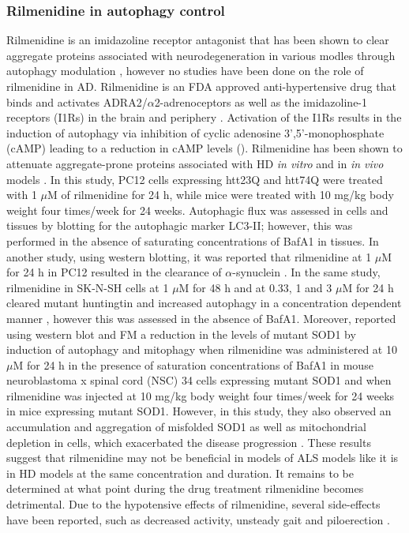 \subsubsection{Rilmenidine in autophagy control}
Rilmenidine is an imidazoline receptor antagonist that has been shown to clear aggregate proteins associated with neurodegeneration in various modles through autophagy modulation \citep{Rose2010,Williams2008,Perera2018}, however no studies have been done on the role of rilmenidine in AD. Rilmenidine is an FDA approved anti-hypertensive drug that binds and activates ADRA2/$\alpha$2-adrenoceptors as well as the imidazoline-1 receptors (I1Rs) in the brain and periphery \citep{Rose2010}. Activation of the I1Rs results in the induction of autophagy via inhibition of cyclic adenosine 3',5'-monophosphate (cAMP) leading to a reduction in cAMP levels \citep{Williams2008} (). Rilmenidine has been shown to attenuate aggregate-prone proteins associated with HD \textit{in vitro} and in \textit{in vivo} models \citep{Rose2010}. In this study, PC12 cells expressing htt23Q and htt74Q were treated with 1 $\mu$M of rilmenidine for 24 h, while mice were treated with 10 mg/kg body weight four times/week for 24 weeks\citep{Rose2010}. Autophagic flux was assessed in cells and tissues by blotting for the autophagic marker LC3-II; however, this was performed in the absence of saturating concentrations of BafA1 in tissues. In another study, using western blotting, it was reported that rilmenidine at 1 $\mu$M for 24 h in PC12 resulted in the clearance of $\alpha$-synuclein \citep{Williams2008}. In the same study, rilmenidine in SK-N-SH cells at 1 $\mu$M for 48 h and at 0.33, 1 and 3 $\mu$M for 24 h cleared mutant huntingtin and increased autophagy in a concentration dependent manner \citep{Williams2008}, however this was assessed in the absence of BafA1. Moreover,  \citet{Perera2018} reported using western blot and FM a reduction in the levels of mutant SOD1 by induction of autophagy and mitophagy when rilmenidine was administered at 10 $\mu$M for 24 h in the presence of saturation concentrations of BafA1 in mouse neuroblastoma x spinal cord (NSC) 34 cells expressing mutant SOD1 and when rilmenidine was injected at 10 mg/kg body weight four times/week for 24 weeks in mice expressing mutant SOD1. However, in this study, they also observed an accumulation and aggregation of misfolded SOD1 as well as mitochondrial depletion in cells, which exacerbated the disease progression \citep{Perera2018}. These results suggest that rilmenidine may not be beneficial in models of ALS models like it is in HD models at the same concentration and duration. It remains to be determined at what point during the drug treatment rilmenidine becomes detrimental. Due to the hypotensive effects of rilmenidine, several side-effects have been reported, such as decreased activity, unsteady gait and piloerection \citep{Rose2010}.
 
